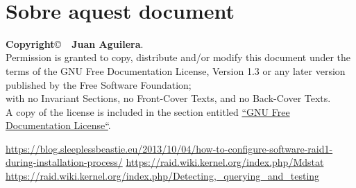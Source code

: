 \documentclass[a4paper]{article}
\begin{document}
 \\
\section{Sobre aquest document}
\textbf{Copyright}\copyright\ \textbf{\the\year\ Juan Aguilera}.\\
Permission is granted to copy, distribute and/or modify this document under the terms of the GNU Free Documentation License, Version 1.3 or any later version published by the Free Software Foundation;\\
with no Invariant Sections, no Front-Cover Texts, and no Back-Cover Texts.\\
A copy of the license is included in the section entitled \href{http://www.gnu.org/licenses/fdl.html}{``GNU Free Documentation License``}.

\begin{thebibliography}{99}
		 \url{https://blog.sleeplessbeastie.eu/2013/10/04/how-to-configure-software-raid1-during-installation-process/}
		 \url{https://raid.wiki.kernel.org/index.php/Mdstat}
		 \url{https://raid.wiki.kernel.org/index.php/Detecting,_querying_and_testing}
\end{thebibliography}
\end{document}
